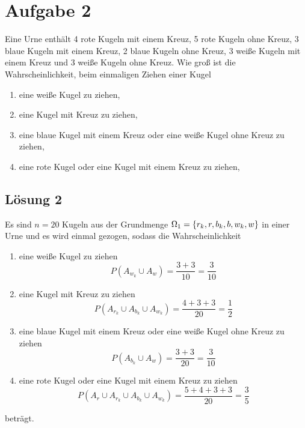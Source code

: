 \documentclass[main.tex]{subfiles}
\begin{document}
\section{Aufgabe 2}
Eine Urne enthält 4 rote Kugeln mit einem Kreuz, 5 rote Kugeln ohne Kreuz, 3 blaue Kugeln mit einem Kreuz, 2 blaue Kugeln ohne Kreuz, 3 weiße Kugeln mit einem Kreuz und 3 weiße Kugeln ohne Kreuz.
Wie groß ist die Wahrscheinlichkeit, beim einmaligen Ziehen einer Kugel
\begin{enumerate}
    \item eine weiße Kugel zu ziehen,
    \item eine Kugel mit Kreuz zu ziehen,
    \item eine blaue Kugel mit einem Kreuz oder eine weiße Kugel ohne Kreuz zu ziehen,
    \item eine rote Kugel oder eine Kugel mit einem Kreuz zu ziehen,
\end{enumerate}

\subsection{Lösung 2}
Es sind $n = 20$ Kugeln aus der Grundmenge $\Omega_1 = \set*{r_k, r, b_k, b, w_k, w}$ in einer Urne und es wird einmal gezogen, sodass die Wahrscheinlichkeit
\begin{enumerate}
    \item eine weiße Kugel zu ziehen $$
        P(A_{w_k} \cup A_{w}) = \frac{3+3}{10} = \frac{3}{10}
    $$
    \item eine Kugel mit Kreuz zu ziehen $$
        P(A_{r_k} \cup A_{b_k} \cup A_{w_k}) = \frac{4+3+3}{20} = \frac{1}{2}
    $$
    \item eine blaue Kugel mit einem Kreuz oder eine weiße Kugel ohne Kreuz zu ziehen $$
        P(A_{b_k} \cup A_{w}) = \frac{3+3}{20} = \frac{3}{10}
    $$
    \item eine rote Kugel oder eine Kugel mit einem Kreuz zu ziehen $$
        P(A_{r} \cup A_{r_k} \cup A_{b_k} \cup A_{w_k}) = \frac{5 + 4 + 3 + 3}{20} = \frac{3}{5}
    $$
\end{enumerate}
beträgt.
\end{document}
